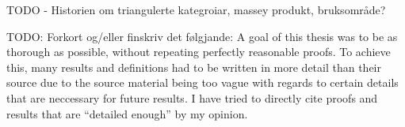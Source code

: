 TODO - Historien om triangulerte kategroiar, massey produkt, bruksområde?

TODO: Forkort og/eller finskriv det følgjande:
A goal of this thesis was to be as thorough as possible, without repeating perfectly reasonable proofs. To achieve this, many results and definitions had to be written in more detail than their source due to the source material being too vague with regards to certain details that are neccessary for future results. I have tried to directly cite proofs and results that are ``detailed enough'' by my opinion.
